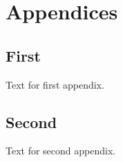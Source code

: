 \documentclass[../main.tex]{subfiles}
\begin{document}
\chapter*{Appendices} \label{chapter:appendices}

\renewcommand{\thesection}{\Alph{section}}
\setcounter{section}{0}
\renewcommand*{\theHsection}{chX.\the\value{section}}

\section{First} \label{appendix:first}

Text for first appendix.

\section{Second} \label{appendix:second}

Text for second appendix.
\end{document}
